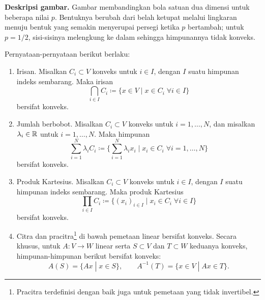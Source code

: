 \noindent\textbf{Deskripsi gambar.} Gambar membandingkan bola satuan dua dimensi untuk beberapa nilai $p$. Bentuknya berubah dari belah ketupat melalui lingkaran menuju bentuk yang semakin menyerupai persegi ketika $p$ bertambah; untuk $p=1/2$, sisi-sisinya melengkung ke dalam sehingga himpunannya tidak konveks.

\begin{lemma}\label{convexity:lemma:ops preserving convexity}
    Pernyataan-pernyataan berikut berlaku:
    \begin{enumerate}
        \item Irisan. Misalkan $C_i\subset V$ konveks untuk $i\in I$, dengan $I$ suatu himpunan indeks sembarang. Maka irisan
        \begin{equation}
            \bigcap_{i\in I} C_i \coloneqq \{x\in V\;|\; x\in C_i\; \forall i\in I\}
        \end{equation}
        bersifat konveks.
        \item Jumlah berbobot. Misalkan $C_i\subset V$ konveks untuk $i=1,\dots,N$, dan misalkan $\lambda_i\in\mathbb{R}$ untuk $i=1,\dots,N$. Maka himpunan
        \begin{equation}
            \sum_{i=1}^N \lambda_i C_i \coloneqq \bigg\{\sum_{i=1}^N \lambda_i x_i\;|\; x_i\in C_i\; \forall i=1,\dots,N\bigg\}
        \end{equation}
        bersifat konveks.
        \item Produk Kartesius. Misalkan $C_i\subset V$ konveks untuk $i\in I$, dengan $I$ suatu himpunan indeks sembarang. Maka produk Kartesius
        \begin{equation}
            \prod_{i\in I} C_i \coloneqq \{(x_i)_{i\in I}\;|\; x_i\in C_i\; \forall i\in I\}
        \end{equation}
        bersifat konveks.
        \item Citra dan pracitra\footnote{Pracitra terdefinisi dengan baik juga untuk pemetaan yang tidak invertibel.} di bawah pemetaan linear bersifat konveks. Secara khusus, untuk $A:V\rightarrow W$ linear serta $S\subset V$ dan $T\subset W$ keduanya konveks, himpunan-himpunan berikut bersifat konveks:
        \begin{equation}
            A(S)=\{Ax\;|\;x\in S\},\qquad A^{-1}(T)=\{x\in V\;|\;Ax\in T\}.
        \end{equation}
    \end{enumerate}
\end{lemma}
